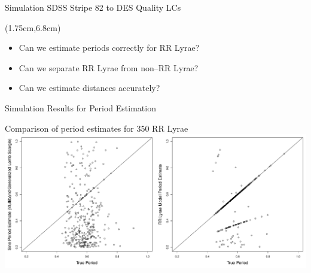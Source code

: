 \documentclass[12pt]{beamer}
\begin{document}
\begin{frame}{Simulation SDSS Stripe 82 to DES Quality LCs}
  \begin{textblock*}{12cm}(1.75cm,6.8cm) %
\begin{itemize}
\item Can we estimate periods correctly for RR Lyrae?
\item Can we separate RR Lyrae from non--RR Lyrae? 
\item Can we estimate distances accurately?
\end{itemize}
\end{textblock*}

\end{frame}


\begin{frame}{Simulation Results for Period Estimation}



\begin{center}
Comparison of period estimates for 350 RR Lyrae\\
\includegraphics[scale=.25]{figs/period_comparison.pdf}
\end{center}



\end{frame}
\end{document}
